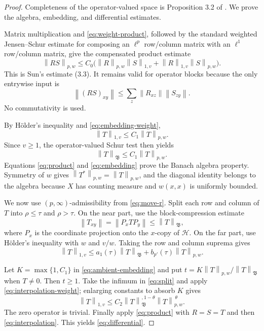 \documentclass[11pt]{article}
\newcommand{\BB}{\mathfrak B}
\newcommand{\norm}[1]{\left\lVert #1\right\rVert}
\newcommand{\snorm}[2]{\left\lVert #1\right\rVert_{#2}}
\begin{document}
\begin{proof}
Completeness of the operator-valued space is Proposition 3.2 of \cite{KB}.
We prove the algebra, embedding, and differential estimates.

Matrix multiplication and \eqref{eq:weight-product}, followed by the standard
weighted Jensen--Schur estimate for composing an $\ell^p$ row/column matrix
with an $\ell^1$ row/column matrix, give the compensated product estimate
\begin{equation}
 \snorm{RS}{p,w}
 \le C_0\bigl(
       \snorm{R}{p,w}\snorm{S}{1,v}
       +\snorm{R}{1,v}\snorm{S}{p,w}
       \bigr).                                          \label{eq:product}
\end{equation}
This is Sun's estimate (3.3).  It remains valid for operator blocks because
the only entrywise input is
\[
 \norm{(RS)_{xy}}
 \le\sum_z\norm{R_{xz}}\norm{S_{zy}}.
\]
No commutativity is used.

By H\"older's inequality and \eqref{eq:embedding-weight},
\begin{equation}
        \snorm{T}{1,v}\le C_1\snorm{T}{p,w}.             \label{eq:embedding}
\end{equation}
Since $v\ge1$, the operator-valued Schur test then yields
\begin{equation}
        \norm{T}_{\BB}\le C_1\snorm{T}{p,w}.            \label{eq:ambient-embedding}
\end{equation}
Equations \eqref{eq:product} and \eqref{eq:embedding} prove the Banach
algebra property.  Symmetry of $w$ gives
$\snorm{T^*}{p,w}=\snorm{T}{p,w}$, and the diagonal identity belongs to the
algebra because $X$ has counting measure and $w(x,x)$ is uniformly bounded.

We now use $(p,\infty)$-admissibility from \eqref{eq:move-r}.  Split each
row and column of $T$ into $\rho\le\tau$ and $\rho>\tau$.  On the near part,
use the block-compression estimate
\begin{equation}
 \norm{T_{xy}}
 =\norm{P_xTP_y}\le\norm{T}_{\BB},                      \label{eq:block-compression}
\end{equation}
where $P_x$ is the coordinate projection onto the $x$-copy of $\mathcal H$.
On the far part, use H\"older's inequality with $w$ and $v/w$.  Taking the
row and column suprema gives
\begin{equation}
 \snorm{T}{1,v}
 \le a_1(\tau)\norm{T}_{\BB}
       +b_{p'}(\tau)\snorm{T}{p,w}.                     \label{eq:split}
\end{equation}

Let $K=\max\{1,C_1\}$ in \eqref{eq:ambient-embedding} and put
$t=K\snorm{T}{p,w}/\norm{T}_{\BB}$ when $T\ne0$.  Then $t\ge1$.
Take the infimum in \eqref{eq:split} and apply
\eqref{eq:interpolation-weight}; enlarging constants to absorb $K$ gives
\begin{equation}
 \snorm{T}{1,v}
 \le C_2\norm{T}_{\BB}^{,1-\theta}
             \snorm{T}{p,w}^{\,\theta}.                 \label{eq:interpolation}
\end{equation}
The zero operator is trivial.  Finally apply \eqref{eq:product} with
$R=S=T$ and then \eqref{eq:interpolation}.  This yields
\eqref{eq:differential}.
\end{proof}
\end{document}
